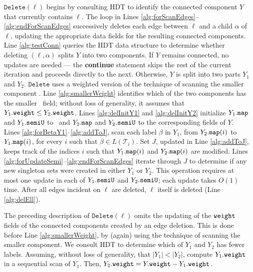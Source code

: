 \documentclass[11pt]{article}
\newcommand{\DelLabel}{\ensuremath{\texttt{Delete}}}
\newcommand{\T}{\ensuremath{\mathcal{T}}}
\theoremstyle{definition}
\begin{document}
$\DelLabel(\ell)$ begins by consulting HDT to identify the connected component $Y$ that currently contains $\ell$.  The loop in Lines \ref{alg:forScanEdges}--\ref{alg:endForScanEdges} successively deletes each edge between $\ell$ and a child $\alpha$ of $\ell$, updating the appropriate data fields for the resulting connected components.  Line \ref{alg:testConn} queries the HDT data structure to determine whether deleting $(\ell,\alpha)$ splits $Y$ into two components. If $Y$ remains connected, no updates are needed --- the \textbf{continue} statement skips the rest of the current iteration and proceeds directly to the next.  Otherwise, $Y$ is split into two parts $Y_1$ and $Y_2$.  $\DelLabel$ uses a weighted version of the technique of scanning the smaller component \cite{EvenShiloach:1981}.  Line \ref{alg:smallerWeight} identifies which of the two components has the smaller \WEIGHT\ field; without loss of generality, it assumes that $Y_1.\mathtt{weight} \le Y_2.\mathtt{weight}$.  Lines \ref{alg:delInitY1} and \ref{alg:delInitY2} initialize $Y_1.\mathtt{map}$ and $Y_1.\mathtt{semiU}$ to \NULL\ and $Y_2.\mathtt{map}$ and $Y_2.\mathtt{semiU}$ to the corresponding fields of $Y$.   Lines \ref{alg:forBetaY1}--\ref{alg:addToJ}, scan each label $\beta$ in $Y_1$, from $Y_2.\mathtt{map}(i)$ to $Y_1.\mathtt{map}(i)$, for every $i$ such that $\beta \in L(\T_i)$.
Set $J$, updated in Line \ref{alg:addToJ}, keeps track of the indices $i$ such that $Y_1.\mathtt{map}(i)$ and $Y_2.\mathtt{map}(i)$ are modified.  Lines \ref{alg:forUpdateSemi}--\ref{alg:endForScanEdges} iterate through $J$ to determine if any new singleton sets were created in either $Y_1$ or $Y_2$.  
This operation requires at most one update in each of $Y_1.\mathtt{semiU}$ and $Y_2.\mathtt{semiU}$; each update takes $O(1)$ time.   After all edges incident on $\ell$ are deleted, $\ell$ itself is deleted (Line \ref{alg:delEll}).

The preceding description of $\DelLabel(\ell)$ omits the updating of the $\mathtt{weight}$ fields of the connected components created by an edge deletion. This is done before Line \ref{alg:smallerWeight}, by (again) using the technique of scanning the smaller component.  We consult HDT to determine which of $Y_1$ and $Y_2$ has fewer labels.  Assuming, without loss of generality, that $|Y_1| < |Y_2|$, compute $Y_1.\mathtt{weight}$ in a sequential scan of $Y_1$.  Then, $Y_2.\mathtt{weight} = Y.\mathtt{weight} - Y_1.\mathtt{weight}$.
\end{document}
